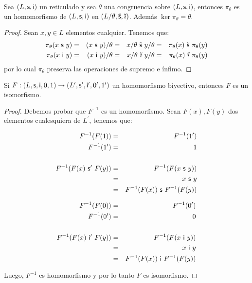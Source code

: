   \begin{lemma} \label{lemma_11}
    \PN Sea $(L, \mathsf{s}, \mathsf{i})$ un reticulado y sea $\theta$ una congruencia sobre $(L, \mathsf{s}, \mathsf{i})$, entonces $\pi_{\theta}$ es un homomorfismo
    de $(L, \mathsf{s}, \mathsf{i})$ en $(L/\theta, \mathsf{\tilde{s}}, \mathsf{\tilde{\imath}})$. Además $\ker \pi_{\theta} = \theta$.
  \end{lemma}
  \begin{proof}
    \PN Sean $x, y \in L$ elementos cualquier. Tenemos que:
      \begin{alignat*}{4}
        \pi_{\theta}(x \ \SU \ y) &=& (x \ \SU \ y)/\theta &=& x/\theta \ \mathsf{\tilde{s}} \ y/\theta &=&
          \pi_{\theta}(x) \ \mathsf{\tilde{s}} \ \pi_{\theta}(y) \\
        \pi_{\theta}(x \ \IN \ y) &=& (x \ \IN \ y)/\theta &=& x/\theta \ \mathsf{\tilde{\imath}} \ y/\theta &=&
          \pi_{\theta}(x) \ \mathsf{\tilde{\imath}} \ \pi_{\theta}(y) \\
      \end{alignat*}
    \PN por lo cual $\pi_{\theta}$ preserva las operaciones de supremo e ínfimo.
  \end{proof}

  \begin{lemma} \label{lemma_12}
    \PN Si $F: (L, \mathsf{s}, \mathsf{i}, 0, 1) \rightarrow (L^{\prime}, \mathsf{s}^{\prime}, \mathsf{i}^{\prime}, 0^{\prime}, 1^{\prime})$ un homomorfismo biyectivo, entonces $F$ es un isomorfismo.
  \end{lemma}
  \begin{proof}
      \PN Debemos probar que $F^{-1}$ es un homomorfismo. Sean $F(x), F(y)$ dos elementos cualesquiera de $L^{\prime}$,
      tenemos que:
      \begin{multicols}{2}
        \begin{eqnarray*}
          F^{-1}(F(1)) &=& F^{-1}(1^{\prime}) \\
          F^{-1}(1^{\prime}) &=& 1 \\
          \\
          F^{-1}(F(x) \ \SU^{\prime} \ F(y)) &=& F^{-1}(F(x \ \SU \ y)) \\
          &=& x \ \SU \ y \\
          &=& F^{-1}(F(x)) \ \SU \ F^{-1}(F(y))
        \end{eqnarray*}

        \begin{eqnarray*}
          F^{-1}(F(0)) &=& F^{-1}(0^{\prime}) \\
          F^{-1}(0^{\prime}) &=& 0 \\
          \\
          F^{-1}(F(x) \ \IN^{\prime} \ F(y)) &=& F^{-1}(F(x \ \IN \ y)) \\
          &=& x \ \IN \ y \\
          &=& F^{-1}(F(x)) \ \IN \ F^{-1}(F(y))
        \end{eqnarray*}
      \end{multicols}

      \PN Luego, $F^{-1}$ es homomorfismo y por lo tanto $F$ es isomorfismo.
  \end{proof}

